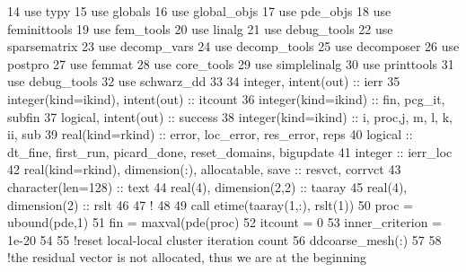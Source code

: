\begin{DoxyCode}
14         \textcolor{keywordtype}{use }typy
15         \textcolor{keywordtype}{use }globals
16         \textcolor{keywordtype}{use }global_objs
17         \textcolor{keywordtype}{use }pde_objs
18         \textcolor{keywordtype}{use }feminittools
19         \textcolor{keywordtype}{use }fem_tools
20         \textcolor{keywordtype}{use }linalg
21         \textcolor{keywordtype}{use }debug_tools
22         \textcolor{keywordtype}{use }sparsematrix
23         \textcolor{keywordtype}{use }decomp_vars
24         \textcolor{keywordtype}{use }decomp_tools
25         \textcolor{keywordtype}{use }decomposer
26         \textcolor{keywordtype}{use }postpro
27         \textcolor{keywordtype}{use }femmat
28         \textcolor{keywordtype}{use }core_tools
29         \textcolor{keywordtype}{use }simplelinalg
30         \textcolor{keywordtype}{use }printtools
31         \textcolor{keywordtype}{use }debug_tools
32         \textcolor{keywordtype}{use }schwarz_dd
33 
34         \textcolor{keywordtype}{integer}, \textcolor{keywordtype}{intent(out)} :: ierr
35         \textcolor{keywordtype}{integer(kind=ikind)}, \textcolor{keywordtype}{intent(out)} :: itcount
36         \textcolor{keywordtype}{integer(kind=ikind)} ::  fin, pcg\_it, subfin
37         \textcolor{keywordtype}{logical}, \textcolor{keywordtype}{intent(out)} :: success
38         \textcolor{keywordtype}{integer(kind=ikind)} :: i, proc,j, m, l, k, ii, sub
39         \textcolor{keywordtype}{real(kind=rkind)} :: error, loc\_error, res\_error, reps
40         \textcolor{keywordtype}{logical} :: dt\_fine, first\_run, picard\_done, reset\_domains, bigupdate
41         \textcolor{keywordtype}{integer} :: ierr\_loc
42         \textcolor{keywordtype}{real(kind=rkind)}, \textcolor{keywordtype}{dimension(:)}, \textcolor{keywordtype}{allocatable}, \textcolor{keywordtype}{save} :: resvct, corrvct
43         \textcolor{keywordtype}{character(len=128)} :: text
44         \textcolor{keywordtype}{real(4)}, \textcolor{keywordtype}{dimension(2,2)} :: taaray
45         \textcolor{keywordtype}{real(4)}, \textcolor{keywordtype}{dimension(2)} :: rslt
46 
47 \textcolor{comment}{!       }
48 
49         \textcolor{keyword}{call }etime(taaray(1,:), rslt(1))
50         proc = ubound(pde,1)
51         fin = maxval(pde(proc)%
52         itcount = 0
53         inner_criterion = 1e-20
54 
55         \textcolor{comment}{!reset local-local cluster iteration count}
56         ddcoarse_mesh(:)%
57         
58         \textcolor{comment}{!the residual vector is not allocated, thus we are at the beginning}

\end{DoxyCode}
